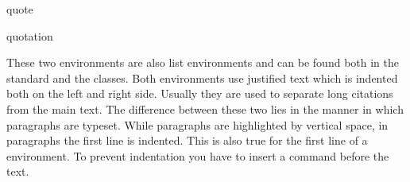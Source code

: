   \begin{Declaration}
    \begin{Environment}{quote}\end{Environment}
    \begin{Environment}{quotation}\end{Environment}
  \end{Declaration}%
  These two environments are also list environments and can be found both in
  the standard and the {\KOMAScript} classes. Both environments use justified
  text which is indented both on the left and right side.  Usually they are
  used to separate long citations from the main text. The
  difference between these two lies in the manner in which paragraphs are
  typeset. While  paragraphs are highlighted by vertical
  space, in  paragraphs the first line is
  indented. This is also true for the first line of a 
  environment. To prevent indentation you have to insert a 
  command before the text.

